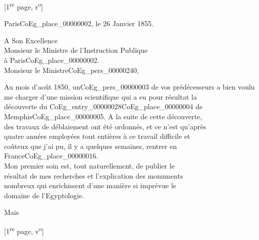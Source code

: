\documentclass{book}
\begin{document}
{\footnotesize\begin{center} {[1\textsuperscript{re} page, r\textsuperscript{o}]}\end{center}}
\begin{flushright}Paris\gls{CoEg_place_00000002}, le 26 Janvier 1855.\end{flushright}
\indent A Son Excellence\\
\indent\hspace{1cm} Monsieur le Ministre de l’Instruction Publique\\
\indent\hspace{8cm} à Paris\gls{CoEg_place_00000002}.\\

\hspace{1cm} Monsieur le Ministre\gls{CoEg_pers_00000240},\\

\par Au mois d’août 1850, un\gls{CoEg_pers_00000003} de vos prédécesseurs a bien voulu\\
me charger d’une mission scientifique qui a eu pour résultat la\\
découverte du \Gls{CoEg_entry_00000028}\gls{CoEg_place_00000004} de Memphis\gls{CoEg_place_00000005}. A la suite de cette découverte,\\
des travaux de déblaiement ont été ordonnés, et ce n’est qu’après\\
quatre années employées tout entières à ce travail difficile et\\
coûteux que j’ai pu, il y a quelques semaines, rentrer en France\gls{CoEg_place_00000016}.\\
\indent Mon premier soin est, tout naturellement, de publier le\\
résultat de mes recherches et l’explication des monuments\\
nombreux qui enrichissent d’une manière si imprévue le\\
domaine de l’Egyptologie.
\begin{flushright}Mais\end{flushright}
{\footnotesize\begin{center} {[1\textsuperscript{re} page, v\textsuperscript{o}]}\end{center}}
\end{document}

